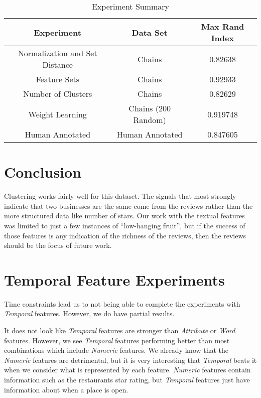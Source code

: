 \documentclass{article}
\begin{document}
   \begin{table}
      \scriptsize
      \begin{center}
         \begin{tabular}{| c | c | c |}
            \hline
               Experiment & Data Set & Max Rand Index \\
            \hline
               Normalization and Set Distance & Chains & 0.82638 \\
               Feature Sets & Chains & 0.92933 \\
               Number of Clusters & Chains & 0.82629 \\
               Weight Learning & Chains (200 Random) & 0.919748 \\
               Human Annotated & Human Annotated & 0.847605 \\
            \hline
         \end{tabular}
         \caption{Experiment Summary}
         \label{tab:experiment-summary}
      \end{center}
   \end{table}

\section{Conclusion}
   Clustering works fairly well for this dataset.
   The signals that most strongly indicate that two businesses are the same come from the reviews rather than the more structured data like number of stars.
   Our work with the textual features was limited to just a few instances of ``low-hanging fruit'',
   but if the success of those features is any indication of the richness of the reviews, then the reviews should be the focus of future work.

\appendix
\appendixpage

\section{Temporal Feature Experiments}
\label{appendix:temporal-features}
   Time constraints lead us to not being able to complete the experiments with \textit{Temporal} features.
   However, we do have partial results.

   It does not look like \textit{Temporal} features are stronger than \textit{Attribute} or \textit{Word} features.
   However, we see \textit{Temporal} features performing better than most combinations which include \textit{Numeric} features.
   We already know that the \textit{Numeric} features are detrimental, but it is very interesting that \textit{Temporal} beats it when we consider what is represented by each feature.
   \textit{Numeric} features contain information such as the restaurants star rating, but \textit{Temporal} features just have information about when a place is open.
\end{document}
